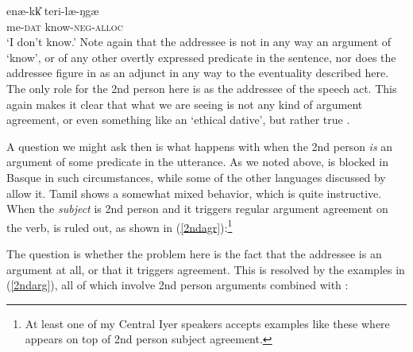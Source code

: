 \documentclass[output=paper, modfonts, nonflat]{langsci/langscibook}
\begin{document}
\ea\label{dunno}\gll enæ-kk\U{} teri-læ-ŋgæ\\
me-\textsc{dat}{} know-\textsc{neg}-\textsc{alloc}\\
\glt `I don't know.'
\z
%
Note again that the addressee is not in any way an argument of `know',
or of any other overtly expressed predicate in the sentence, nor does
the addressee figure in as an adjunct in any way to the eventuality
described here. The only role for the 2nd person here is as the
addressee of the speech act. This again makes it clear that what we
are seeing is not any kind of argument agreement, or even something
like an `ethical dative', but rather true \allagr.


A question we might ask then is what happens with \allagr{} when the
2nd person \emph{is} an argument of some predicate in the
utterance. As we noted above, \allagr{} is blocked in Basque in such
circumstances, while some of the other languages discussed by
\citet{antonov:2015} allow it. Tamil shows a somewhat mixed behavior,
which is quite instructive. When the \emph{subject} is 2nd person and
it triggers regular argument agreement on the verb, \allagr{} is ruled
out, as shown in (\ref{2ndagr}):\footnote{At least one of my Central
  Iyer speakers accepts examples like these where \allagr{} appears on
  top of 2nd person subject agreement.}

\ea\label{2ndagr}
  \z
\z
%
The question is whether the problem here is the fact that the
addressee is an argument at all, or that it triggers
agreement. %
This is resolved by the examples in (\ref{2ndarg}), all of which
involve 2nd person arguments combined with \allagr:
\end{document}
